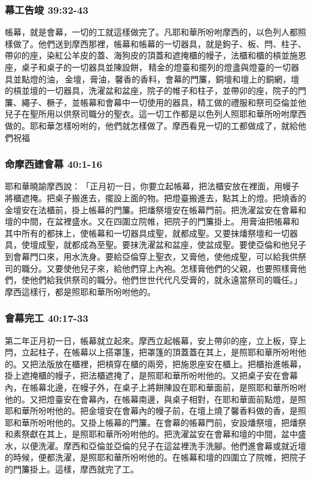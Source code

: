 \begin{table}
\subsubsection{幕工告竣 39:32-43}
帳幕，就是會幕，一切的工就這樣做完了。凡耶和華所吩咐摩西的，以色列人都照樣做了。他們送到摩西那裡，帳幕和帳幕的一切器具，就是鉤子、板、閂、柱子、帶卯的座，染紅公羊皮的蓋、海狗皮的頂蓋和遮掩櫃的幔子，法櫃和櫃的槓並施恩座，桌子和桌子的一切器具並陳設餅， 精金的燈臺和擺列的燈盞與燈臺的一切器具並點燈的油， 金壇，膏油，馨香的香料，會幕的門簾，銅壇和壇上的銅網，壇的槓並壇的一切器具，洗濯盆和盆座，院子的帷子和柱子，並帶卯的座，院子的門簾、繩子、橛子，並帳幕和會幕中一切使用的器具，精工做的禮服和祭司亞倫並他兒子在聖所用以供祭司職分的聖衣。這一切工作都是以色列人照耶和華所吩咐摩西做的。耶和華怎樣吩咐的，他們就怎樣做了。摩西看見一切的工都做成了，就給他們祝福


\subsubsection{命摩西建會幕 40:1-16}
耶和華曉諭摩西說： 「正月初一日，你要立起帳幕，把法櫃安放在裡面，用幔子將櫃遮掩。把桌子搬進去，擺設上面的物。把燈臺搬進去，點其上的燈。把燒香的金壇安在法櫃前，掛上帳幕的門簾。把燔祭壇安在帳幕門前。把洗濯盆安在會幕和壇的中間，在盆裡盛水。又在四圍立院帷，把院子的門簾掛上。 用膏油把帳幕和其中所有的都抹上，使帳幕和一切器具成聖，就都成聖。又要抹燔祭壇和一切器具，使壇成聖，就都成為至聖。要抹洗濯盆和盆座，使盆成聖。要使亞倫和他兒子到會幕門口來，用水洗身。要給亞倫穿上聖衣，又膏他，使他成聖，可以給我供祭司的職分。又要使他兒子來，給他們穿上內袍。怎樣膏他們的父親，也要照樣膏他們，使他們給我供祭司的職分。他們世世代代凡受膏的，就永遠當祭司的職任。」摩西這樣行，都是照耶和華所吩咐他的。


\subsubsection{會幕完工 40:17-33 }
第二年正月初一日，帳幕就立起來。摩西立起帳幕，安上帶卯的座，立上板，穿上閂，立起柱子，在帳幕以上搭罩篷，把罩篷的頂蓋蓋在其上，是照耶和華所吩咐他的。又把法版放在櫃裡，把槓穿在櫃的兩旁，把施恩座安在櫃上。把櫃抬進帳幕，掛上遮掩櫃的幔子，把法櫃遮掩了，是照耶和華所吩咐他的。又把桌子安在會幕內，在帳幕北邊，在幔子外，在桌子上將餅陳設在耶和華面前，是照耶和華所吩咐他的。又把燈臺安在會幕內，在帳幕南邊，與桌子相對，在耶和華面前點燈，是照耶和華所吩咐他的。把金壇安在會幕內的幔子前，在壇上燒了馨香料做的香，是照耶和華所吩咐他的。又掛上帳幕的門簾。在會幕的帳幕門前，安設燔祭壇，把燔祭和素祭獻在其上，是照耶和華所吩咐他的。把洗濯盆安在會幕和壇的中間，盆中盛水，以便洗濯。摩西和亞倫並亞倫的兒子在這盆裡洗手洗腳。他們進會幕或就近壇的時候，便都洗濯，是照耶和華所吩咐他的。在帳幕和壇的四圍立了院帷，把院子的門簾掛上。這樣，摩西就完了工。


\end{table}
